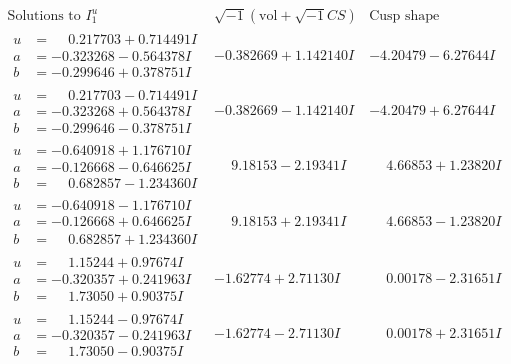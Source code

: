 \documentclass[1p]{elsarticle_modified}
\theoremstyle{definition}
\newcommand{\I}{\sqrt{-1}}
\begin{document}
$$\begin{array}{c|c|c}  
\text{Solutions to }I^u_{1}& \I (\text{vol} + \sqrt{-1}CS) & \text{Cusp shape}\\
 \hline 
\begin{aligned}
u &= \phantom{-}0.217703 + 0.714491 I \\
a &= -0.323268 - 0.564378 I \\
b &= -0.299646 + 0.378751 I\end{aligned}
 & -0.382669 + 1.142140 I & -4.20479 - 6.27644 I \\ \hline\begin{aligned}
u &= \phantom{-}0.217703 - 0.714491 I \\
a &= -0.323268 + 0.564378 I \\
b &= -0.299646 - 0.378751 I\end{aligned}
 & -0.382669 - 1.142140 I & -4.20479 + 6.27644 I \\ \hline\begin{aligned}
u &= -0.640918 + 1.176710 I \\
a &= -0.126668 - 0.646625 I \\
b &= \phantom{-}0.682857 - 1.234360 I\end{aligned}
 & \phantom{-}9.18153 - 2.19341 I & \phantom{-}4.66853 + 1.23820 I \\ \hline\begin{aligned}
u &= -0.640918 - 1.176710 I \\
a &= -0.126668 + 0.646625 I \\
b &= \phantom{-}0.682857 + 1.234360 I\end{aligned}
 & \phantom{-}9.18153 + 2.19341 I & \phantom{-}4.66853 - 1.23820 I \\ \hline\begin{aligned}
u &= \phantom{-}1.15244 + 0.97674 I \\
a &= -0.320357 + 0.241963 I \\
b &= \phantom{-}1.73050 + 0.90375 I\end{aligned}
 & -1.62774 + 2.71130 I & \phantom{-}0.00178 - 2.31651 I \\ \hline\begin{aligned}
u &= \phantom{-}1.15244 - 0.97674 I \\
a &= -0.320357 - 0.241963 I \\
b &= \phantom{-}1.73050 - 0.90375 I\end{aligned}
 & -1.62774 - 2.71130 I & \phantom{-}0.00178 + 2.31651 I \\ \hline\begin{aligned}

\end{aligned}
\end{array}$$
\end{document}
